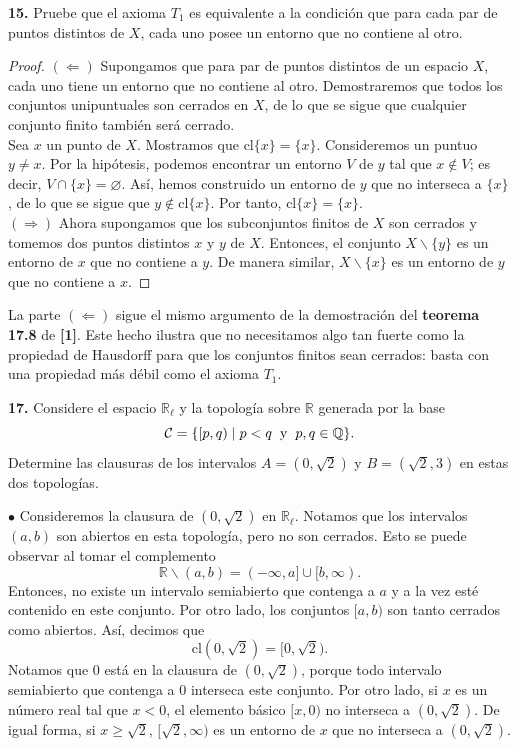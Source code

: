 \documentclass{article}
\begin{document}
\begin{mybox}
	\textbf{15. } Pruebe que el axioma $T_{1}$ es equivalente a la condición que para cada par de puntos distintos de $X$, cada uno posee un entorno que no contiene al otro. 
\end{mybox}	
\begin{proof}
	$(\Leftarrow)$ Supongamos que para par de puntos distintos de un espacio $X$, cada uno tiene un entorno que no contiene al otro. Demostraremos que todos los conjuntos unipuntuales son cerrados en $X$, de lo que se sigue que cualquier conjunto finito también será cerrado. \\
	Sea $x$ un punto de $X$. Mostramos que $\text{cl}\{x\} = \{x\}$. Consideremos un puntuo $y \neq x$. Por la hipótesis, podemos encontrar un entorno $V$ de $y$ tal que $x \notin V$; es decir, $V \cap \{x\} = \varnothing$. Así, hemos construido un entorno de $y$ que no interseca a $\{ x \}$, de lo que se sigue que $y \notin \text{cl}\{x\}$. Por tanto, $\text{cl}\{x\} = \{x\}$. \\
	$(\Rightarrow)$ Ahora supongamos que los subconjuntos finitos de $X$ son cerrados y tomemos dos puntos distintos $x$ y $y$ de $X$. Entonces, el conjunto $X \backslash \{y\}$ es un entorno de $x$ que no contiene a $y$. De manera similar, $X \backslash \{ x \}$ es un entorno de $y$ que no contiene a $x$.
\end{proof}
La parte $(\Leftarrow)$ sigue el mismo argumento de la demostración del \textbf{teorema 17.8} de \textbf{[1]}. Este hecho ilustra que no necesitamos algo tan fuerte como la propiedad de Hausdorff para que los conjuntos finitos sean cerrados: basta con una propiedad más débil como el axioma $T_{1}$. 
\vspace{0.5cm}
\begin{mybox}
	\textbf{17. } Considere el espacio $\mathbb{R}_{\ell}$ y la topología sobre $\mathbb{R}$ generada por la base
	$$ \mathcal{C} = \{ [p, q) \mid p < q \hspace{0.2cm} \text{y} \hspace{0.2cm} p, q \in \mathbb{Q} \} .$$
	Determine las clausuras de los intervalos $A = (0, \sqrt{2})$ y $B = (\sqrt{2}, 3)$ en estas dos topologías. 
\end{mybox}	
$\bullet$ Consideremos la clausura de $(0, \sqrt{2})$ en $\mathbb{R}_{\ell}$. Notamos que los intervalos $(a, b)$ son abiertos en esta topología, pero no son cerrados. Esto se puede observar al tomar el complemento
$$ \mathbb{R} \backslash (a, b) = (- \infty, a] \cup [b, \infty). $$
Entonces, no existe un intervalo semiabierto que contenga a $a$ y a la vez esté contenido en este conjunto. Por otro lado, los conjuntos $[a, b)$ son tanto cerrados como abiertos. Así, decimos que 
$$ \text{cl}(0, \sqrt{2}) = [0, \sqrt{2}). $$
Notamos que $0$ está en la clausura de $(0, \sqrt{2})$, porque todo intervalo semiabierto que contenga a $0$ interseca este conjunto. Por otro lado, si $x$ es un número real tal que $x < 0$, el elemento básico $[x, 0)$ no interseca a $(0, \sqrt{2})$. De igual forma, si $x \geq \sqrt{2}$, $[\sqrt{2}, \infty)$ es un entorno de $x$ que no interseca a $(0, \sqrt{2})$. \\
\end{document}
